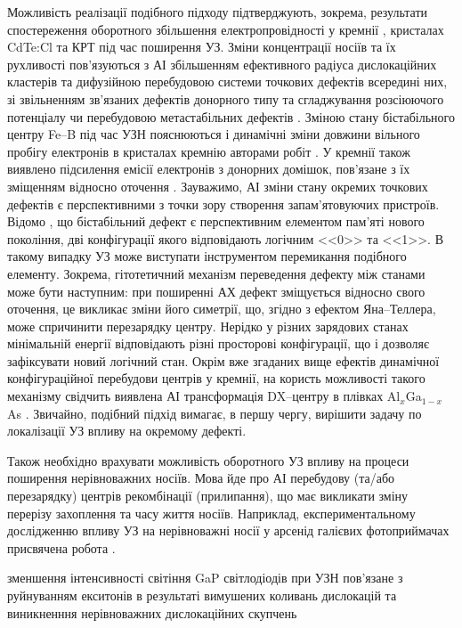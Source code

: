 Можливість реалізації подібного підходу підтверджують, зокрема, результати спостереження оборотного
збільшення електропровідності у кремнії \cite{YOlikhTPL2011r}, кристалах CdTe:Cl \cite{YOlikh:UFG2016,YOlikh:SupMicr} та КРТ \cite{OlikhYFTP99,OlikhYFTP2000} під час поширення УЗ.
Зміни концентрації носіїв та їх рухливості пов'язуються з АІ
збільшенням ефективного радіуса дислокаційних кластерів та дифузійною перебудовою системи точкових дефектів всередині них\cite{YOlikh:UFG2016,YOlikh:SupMicr},
зі звільненням зв'язаних дефектів донорного типу та сгладжування розсіюючого потенціалу \cite{OlikhYFTP99,OlikhYFTP2000}
чи перебудовою метастабільних дефектів \cite{YOlikhTPL2011r}.
Зміною стану бістабільного центру Fe--B під час УЗН пояснюються і динамічні зміни довжини вільного пробігу електронів в кристалах кремнію авторами робіт \cite{Ostrovskii2001,OlikhFTT}.
У кремнії також виявлено підсилення емісії електронів з донорних домішок, пов'язане з їх зміщенням відносно оточення \cite{Korotchenkov1995}.
Зауважимо, АІ зміни стану окремих точкових дефектів є перспективними з точки зору створення запам'ятовуючих пристроїв.
Відомо \cite{MetaUFN}, що бістабільний дефект є перспективним елементом пам'яті нового покоління,
дві конфігурації якого відповідають логічним <<0>> та <<1>>.
В такому випадку УЗ може виступати інструментом перемикання подібного елементу.
Зокрема, гітотетичний механізм переведення дефекту між станами може бути наступним:
при поширенні АХ дефект зміщується відносно свого оточення, це викликає зміни його симетрії, що, згідно з ефектом Яна--Теллера, може спричинити перезарядку центру.
Нерідко у різних зарядових станах мінімальній енергії відповідають різні просторові конфігурації, що і дозволяє зафіксувати новий логічний стан.
Окрім вже згаданих вище ефектів динамічної конфігураційної перебудови центрів у кремнії, на користь
можливості такого механізму свідчить виявлена АІ трансформація DX--центру в плівках Al$_x$Ga$_{1-x}$As \cite{belyaev1994}.
Звичайно, подібний підхід вимагає, в першу чергу, вирішити задачу по локалізації УЗ впливу на окремому дефекті.

Також необхідно врахувати можливість оборотного УЗ впливу на процеси поширення нерівноважних носіїв.
Мова йде про АІ перебудову (та/або перезарядку)  центрів рекомбінації (прилипання), що має викликати зміну перерізу захоплення та часу життя носіїв.
Наприклад, експериментальному дослідженню впливу УЗ на нерівноважні носії у арсенід галієвих фотоприймачах присвячена робота \cite{Zaveryukhin2002:2}.

зменшення інтенсивності світіння GaP світлодіодів при УЗН пов'язане з руйнуванням екситонів в результаті вимушених коливань дислокацій та виникненння нерівноважних дислокаційних скупчень \cite{USL:GaP}

